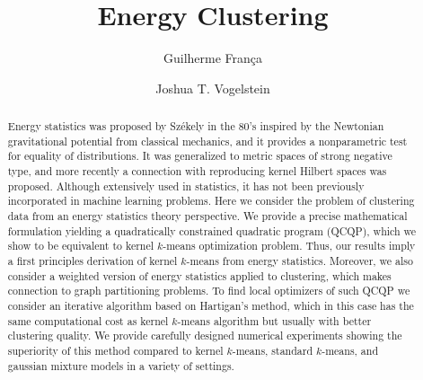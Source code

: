 \documentclass[aps,preprint,nofootinbib,floatfix]{revtex4-1}
\begin{document}
\title{Energy Clustering}

\author{Guilherme Fran\c ca}

\author{Joshua T. Vogelstein}



\begin{abstract}
Energy statistics 
was proposed by 
Sz\' ekely in the 80's
inspired by the Newtonian gravitational potential from classical mechanics,
and it provides a nonparametric test for equality of distributions.
It was generalized to 
metric spaces of strong negative type,
and more recently a connection with reproducing kernel Hilbert spaces 
was proposed.
Although  
extensively used in statistics, it
has not been previously incorporated in machine learning problems.
Here we consider the problem of clustering data from
an energy statistics theory perspective.
We provide a precise mathematical formulation yielding
a quadratically constrained quadratic program (QCQP), which we show
to be equivalent
to kernel $k$-means optimization problem.
Thus, our results imply a first principles derivation of 
kernel $k$-means from energy statistics.
Moreover, we also consider a weighted version of energy statistics 
applied to clustering, which makes connection to 
graph partitioning problems.
To find local optimizers of such QCQP we consider an iterative
algorithm based on Hartigan's method, which in this case
has the same computational cost 
as kernel $k$-means algorithm but usually with better clustering
quality. We provide carefully designed numerical experiments
showing the superiority of this method compared to
kernel $k$-means, standard $k$-means, and gaussian mixture models in a variety of settings.
\end{abstract}

\maketitle

\end{document}
